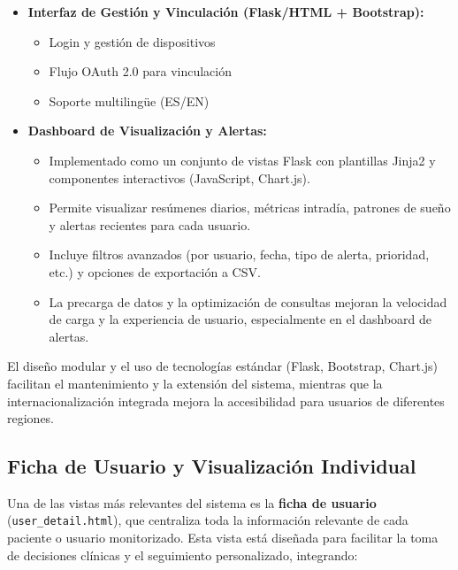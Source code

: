 \begin{itemize}
    \item \textbf{Interfaz de Gestión y Vinculación (Flask/HTML + Bootstrap):}
        \begin{itemize}
            \item Login y gestión de dispositivos
            \item Flujo OAuth 2.0 para vinculación
            \item Soporte multilingüe (ES/EN)
        \end{itemize}
    \item \textbf{Dashboard de Visualización y Alertas:}
        \begin{itemize}
            \item Implementado como un conjunto de vistas Flask con plantillas Jinja2 y componentes interactivos (JavaScript, Chart.js).
            \item Permite visualizar resúmenes diarios, métricas intradía, patrones de sueño y alertas recientes para cada usuario.
            \item Incluye filtros avanzados (por usuario, fecha, tipo de alerta, prioridad, etc.) y opciones de exportación a CSV.
            \item La precarga de datos y la optimización de consultas mejoran la velocidad de carga y la experiencia de usuario, especialmente en el dashboard de alertas.
        \end{itemize}
\end{itemize}

El diseño modular y el uso de tecnologías estándar (Flask, Bootstrap, Chart.js) facilitan el mantenimiento y la extensión del sistema, mientras que la internacionalización integrada mejora la accesibilidad para usuarios de diferentes regiones.

\subsection{Ficha de Usuario y Visualización Individual}
Una de las vistas más relevantes del sistema es la \textbf{ficha de usuario} (\texttt{user\_detail.html}), que centraliza toda la información relevante de cada paciente o usuario monitorizado. Esta vista está diseñada para facilitar la toma de decisiones clínicas y el seguimiento personalizado, integrando:

